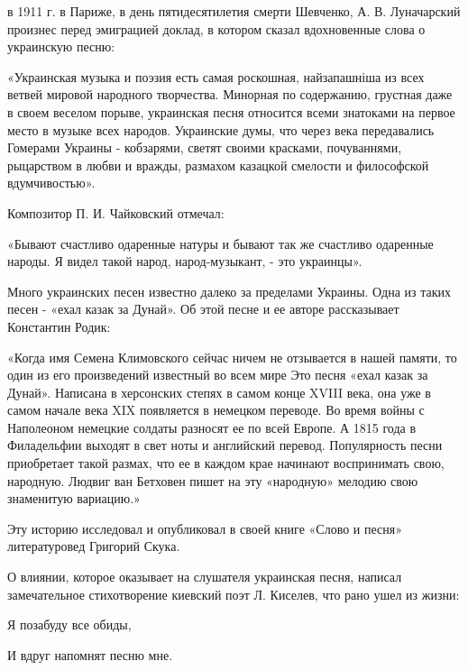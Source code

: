 в 1911 г. в Париже, в день пятидесятилетия смерти Шевченко, А. В. Луначарский произнес перед эмиграцией доклад, в котором сказал вдохновенные слова о украинскую песню:



«Украинская музыка и поэзия есть самая роскошная, найзапашніша из всех ветвей мировой народного творчества. Минорная по содержанию, грустная даже в своем веселом порыве, украинская песня относится всеми знатоками на первое место в музыке всех народов. Украинские думы, что через века передавались Гомерами Украины - кобзарями, светят своими красками, почуваннями, рыцарством в любви и вражды, размахом казацкой смелости и философской вдумчивостью».



Композитор П. И. Чайковский отмечал:



«Бывают счастливо одаренные натуры и бывают так же счастливо одаренные народы. Я видел такой народ, народ-музыкант, - это украинцы».



Много украинских песен известно далеко за пределами Украины. Одна из таких песен - «ехал казак за Дунай». Об этой песне и ее авторе рассказывает Константин Родик:



«Когда имя Семена Климовского сейчас ничем не отзывается в нашей памяти, то один из его произведений известный во всем мире Это песня «ехал казак за Дунай». Написана в херсонских степях в самом конце XVIII века, она уже в самом начале века XIX появляется в немецком переводе. Во время войны с Наполеоном немецкие солдаты разносят ее по всей Европе. А 1815 года в Филадельфии выходят в свет ноты и английский перевод. Популярность песни приобретает такой размах, что ее в каждом крае начинают воспринимать свою, народную. Людвиг ван Бетховен пишет на эту «народную» мелодию свою знаменитую вариацию.»



Эту историю исследовал и опубликовал в своей книге «Слово и песня» литературовед Григорий Скука.



О влиянии, которое оказывает на слушателя украинская песня, написал замечательное стихотворение киевский поэт Л. Киселев, что рано ушел из жизни:



Я позабуду все обиды,



И вдруг напомнят песню мне.



